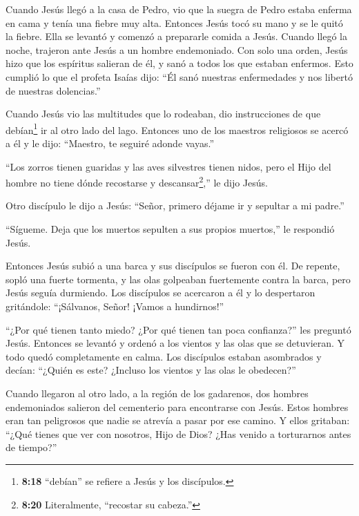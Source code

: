  Cuando Jesús llegó a la casa de Pedro, vio que la suegra
de Pedro estaba enferma en cama y tenía una fiebre muy alta.
 Entonces Jesús tocó su mano y se le quitó la fiebre. Ella
se levantó y comenzó a prepararle comida a Jesús.  Cuando
llegó la noche, trajeron ante Jesús a un hombre endemoniado. Con solo
una orden, Jesús hizo que los espíritus salieran de él, y sanó a todos
los que estaban enfermos.  Esto cumplió lo que el profeta
Isaías dijo: ``Él sanó nuestras enfermedades y nos libertó de nuestras
dolencias.''

 Cuando Jesús vio las multitudes que lo rodeaban, dio
instrucciones de que debían\footnote{\textbf{8:18} ``debían'' se refiere
  a Jesús y los discípulos.} ir al otro lado del lago. 
Entonces uno de los maestros religiosos se acercó a él y le dijo:
``Maestro, te seguiré adonde vayas.''

 ``Los zorros tienen guaridas y las aves silvestres tienen
nidos, pero el Hijo del hombre no tiene dónde recostarse y
descansar\footnote{\textbf{8:20} Literalmente, ``recostar su cabeza.''},''
le dijo Jesús.

 Otro discípulo le dijo a Jesús: ``Señor, primero déjame ir
y sepultar a mi padre.''

 ``Sígueme. Deja que los muertos sepulten a sus propios
muertos,'' le respondió Jesús.

 Entonces Jesús subió a una barca y sus discípulos se
fueron con él.  De repente, sopló una fuerte tormenta, y
las olas golpeaban fuertemente contra la barca, pero Jesús seguía
durmiendo.  Los discípulos se acercaron a él y lo
despertaron gritándole: ``¡Sálvanos, Señor! ¡Vamos a hundirnos!''

 ``¿Por qué tienen tanto miedo? ¿Por qué tienen tan poca
confianza?'' les preguntó Jesús. Entonces se levantó y ordenó a los
vientos y las olas que se detuvieran. Y todo quedó completamente en
calma.  Los discípulos estaban asombrados y decían:
``¿Quién es este? ¿Incluso los vientos y las olas le obedecen?''

 Cuando llegaron al otro lado, a la región de los
gadarenos, dos hombres endemoniados salieron del cementerio para
encontrarse con Jesús. Estos hombres eran tan peligrosos que nadie se
atrevía a pasar por ese camino.  Y ellos gritaban: ``¿Qué
tienes que ver con nosotros, Hijo de Dios? ¿Has venido a torturarnos
antes de tiempo?''

